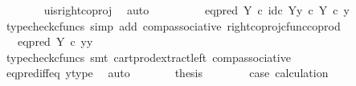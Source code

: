 \begin{isabellebody}
\ \ \ \ \ \ \isamarkupfalse%
\ u{\isacharunderscore}{\kern0pt}is{\isacharunderscore}{\kern0pt}right{\isacharunderscore}{\kern0pt}coproj\ \isamarkupfalse%
\ auto\isanewline
\ \ \ \ \isamarkupfalse%
\ \isamarkupfalse%
\ {\isachardoublequoteopen}{\isachardot}{\kern0pt}{\isachardot}{\kern0pt}{\isachardot}{\kern0pt}\ {\isacharequal}{\kern0pt}\ {\isacharparenleft}{\kern0pt}eq{\isacharunderscore}{\kern0pt}pred\ Y\ {\isasymcirc}\isactrlsub c\ {\isasymlangle}id\isactrlsub c\ Y{\isacharcomma}{\kern0pt}y\ {\isasymcirc}\isactrlsub c\ {\isasymbeta}\isactrlbsub Y\isactrlesub {\isasymrangle}{\isacharparenright}{\kern0pt}\ {\isasymcirc}\isactrlsub c\ y{\isachardoublequoteclose}\isanewline
\ \ \ \ \ \ \isamarkupfalse%
\ {\isacharparenleft}{\kern0pt}typecheck{\isacharunderscore}{\kern0pt}cfuncs{\isacharcomma}{\kern0pt}\ simp\ add{\isacharcolon}{\kern0pt}\ comp{\isacharunderscore}{\kern0pt}associative{}\ right{\isacharunderscore}{\kern0pt}coproj{\isacharunderscore}{\kern0pt}cfunc{\isacharunderscore}{\kern0pt}coprod{\isacharparenright}{\kern0pt}\isanewline
\ \ \ \ \isamarkupfalse%
\ \isamarkupfalse%
\ {\isachardoublequoteopen}{\isachardot}{\kern0pt}{\isachardot}{\kern0pt}{\isachardot}{\kern0pt}\ {\isacharequal}{\kern0pt}\ eq{\isacharunderscore}{\kern0pt}pred\ Y\ {\isasymcirc}\isactrlsub c\ {\isasymlangle}y{\isacharcomma}{\kern0pt}y{\isasymrangle}{\isachardoublequoteclose}\isanewline
\ \ \ \ \ \ \isamarkupfalse%
\ {\isacharparenleft}{\kern0pt}typecheck{\isacharunderscore}{\kern0pt}cfuncs{\isacharcomma}{\kern0pt}\ smt\ cart{\isacharunderscore}{\kern0pt}prod{\isacharunderscore}{\kern0pt}extract{\isacharunderscore}{\kern0pt}left\ comp{\isacharunderscore}{\kern0pt}associative{}{\isacharparenright}{\kern0pt}\isanewline
\ \ \ \ \isamarkupfalse%
\ \isamarkupfalse%
\ {\isachardoublequoteopen}{\isachardot}{\kern0pt}{\isachardot}{\kern0pt}{\isachardot}{\kern0pt}\ {\isacharequal}{\kern0pt}\ {\isasymt}{\isachardoublequoteclose}\isanewline
\ \ \ \ \ \ \isamarkupfalse%
\ eq{\isacharunderscore}{\kern0pt}pred{\isacharunderscore}{\kern0pt}iff{\isacharunderscore}{\kern0pt}eq\ y{\isacharunderscore}{\kern0pt}type\ \isamarkupfalse%
\ auto\isanewline
\ \ \ \ \isamarkupfalse%
\ \isamarkupfalse%
\ {\isacharquery}{\kern0pt}thesis\isanewline
\ \ \ \ \ \ \isamarkupfalse%
\ case{}\ calculation\ \isamarkupfalse%

\end{isabellebody}
